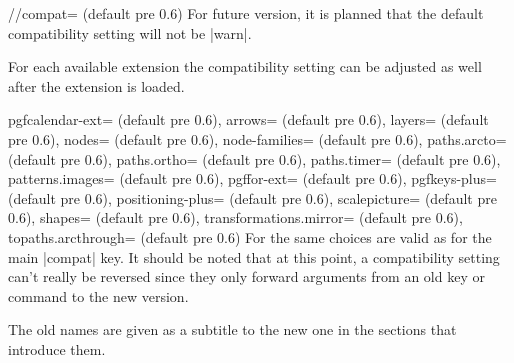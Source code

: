\begin{multicols}{2}
\begin{key}{/\tikzext/compat= (default pre 0.6)}
  For future version, it is planned that the default compatibility setting will not be |warn|.
\end{key}

\newcolumn\noindent
For each available extension the compatibility setting can be adjusted as well
after the extension is loaded.
\begin{keylist}{%
  pgfcalendar-ext= (default pre 0.6),
  arrows= (default pre 0.6),
  layers= (default pre 0.6),
  nodes= (default pre 0.6),
  node-families= (default pre 0.6),
  paths.arcto= (default pre 0.6),
  paths.ortho= (default pre 0.6),
  paths.timer= (default pre 0.6),
  patterns.images= (default pre 0.6),
  pgffor-ext= (default pre 0.6),
  pgfkeys-plus= (default pre 0.6),
  positioning-plus= (default pre 0.6),
  scalepicture= (default pre 0.6),
  shapes= (default pre 0.6),
  transformations.mirror= (default pre 0.6),
  topaths.arcthrough= (default pre 0.6)%
}
  For  the same choices are valid as for the main |compat| key.
  It should be noted that at this point, a compatibility setting can't really be reversed
  since they only forward arguments from an old key or command to the new version.
  
  The old names are given as a subtitle to the new one in the sections that introduce them.
\end{keylist}
\end{multicols}